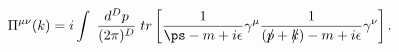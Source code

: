 \begin{equation}
\Pi ^{\mu \nu }(k)=i\int \;\frac{d^{D}p}{(2\pi )^{D}}\;tr\left[ \frac{1}{\ps %
-m+i\epsilon }\gamma ^{\mu }\frac{1}{(p\!\!\!/+k\!\!\!/)-m+i\epsilon }\gamma ^{\nu
}\right] \label{pimini}.
\end{equation}

